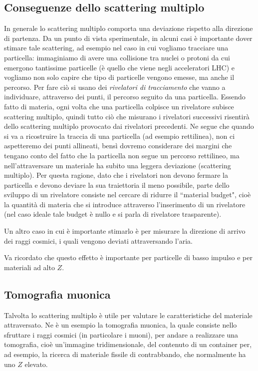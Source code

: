 \subsection{Conseguenze dello scattering multiplo}

In generale lo scattering multiplo comporta una deviazione rispetto alla direzione di partenza. Da un punto di vista sperimentale, in alcuni casi è importante dover stimare tale scattering, ad esempio nel caso in cui vogliamo tracciare una particella: immaginiamo di avere una collisione tra nuclei o protoni da cui emergono tantissime particelle (è quello che viene negli acceleratori LHC) e vogliamo non solo capire che tipo di particelle vengono emesse, ma anche il percorso. Per fare ciò si usano dei \textit{rivelatori di tracciamento} che vanno a individuare, attraverso dei punti, il percorso seguito da una particella. Essendo fatto di materia, ogni volta che una particella colpisce un rivelatore subisce scattering multiplo, quindi tutto ciò che misurano i rivelatori successivi risentirà dello scattering multiplo provocato dai rivelatori precedenti. Ne segue che quando si va a ricostruire la traccia di una particella (ad esempio rettilinea), non ci aspetteremo dei punti allineati, bensì dovremo considerare dei margini che tengano conto del fatto che la particella non segue un percorso rettilineo, ma nell'attraversare un materiale ha subito una leggera deviazione (scattering multiplo). Per questa ragione, dato che i rivelatori non devono fermare la particella e devono deviare la sua traiettoria il meno possibile, parte dello sviluppo di un rivelatore consiste nel cercare di ridurre il ``material budget", cioè la quantità di materia che si introduce attraverso l'inserimento di un rivelatore (nel caso ideale tale budget è nullo e si parla di rivelatore trasparente).

Un altro caso in cui è importante stimarlo è per misurare la direzione di arrivo dei raggi cosmici, i quali vengono deviati attraversando l'aria.

Va ricordato che questo effetto è importante per particelle di basso impulso e per materiali ad alto $Z$.

\subsection{Tomografia muonica}

Talvolta lo scattering multiplo è utile per valutare le caratteristiche del materiale attraversato. Ne è un esempio la tomografia muonica, la quale consiste nello sfruttare i raggi cosmici (in particolare i muoni), per andare a realizzare una tomografia, cioè un'immagine tridimensionale, del contenuto di un container per, ad esempio, la ricerca di materiale fissile di contrabbando, che normalmente ha uno $Z$ elevato.


